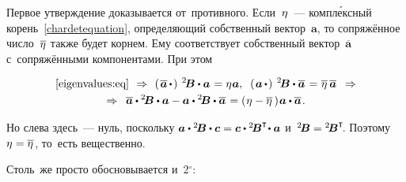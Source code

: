 \begin{otherlanguage}{russian}
Первое утверждение доказывается от~противного. Если~$\eta\hspace{.1ex}$~--- компл\'{е}ксный корень~\eqref{chardetequation}, определяющий собственный вектор~$\bm{a}$, то сопряжённое число~$\overline{\eta\hspace{.1ex}}$ также будет корнем. Ему соответствует собственный вектор~$\overline{\bm{a}}$ с~сопряжёнными компонентами. При этом

\nopagebreak\vspace{-0.4em}\begin{multline*}
\eqref{eigenvalues:eq}
\:\,\Rightarrow\:\,
\left(\hspace{.25ex} {\overline{\bm{a}} \, \dotp} \hspace{.25ex}\right) \hspace{.5ex} {^2\!\bm{B}} \dotp \bm{a} \hspace{.2ex} = \eigenvalue \bm{a}, \;\;
\left(\hspace{.2ex}{\bm{a} \, \dotp}\hspace{.2ex}\right) \hspace{.5ex} {^2\!\bm{B}} \dotp \overline{\bm{a}} \hspace{.2ex} = \hspace{.1ex} \overline{\eigenvalue} \, \overline{\bm{a}}
\:\;\Rightarrow \\[-0.1em]
%
\Rightarrow\;\: \overline{\bm{a}} \dotp {^2\!\bm{B}} \dotp \bm{a} - \bm{a} \dotp {^2\!\bm{B}} \dotp \overline{\bm{a}} \hspace{.2ex} = \left(\hspace{.1ex}{\eigenvalue - \overline{\eigenvalue}}\hspace{.16em}\right)\hspace{-0.1em} \bm{a} \dotp \overline{\bm{a}} \hspace{.2ex} .
\end{multline*}

\vspace{-0.16em} \noindent Но слева здесь~--- нуль, поскольку ${\bm{a} \dotp {^2\!\bm{B}} \dotp \bm{c} = \bm{c} \dotp {^2\!\bm{B}^{\T}\!} \dotp \bm{a}}$ и~${{^2\!\bm{B}} = {^2\!\bm{B}^{\T}\!}}$. Поэтому ${\eta\hspace{.1ex} = \overline{\eta\hspace{.1ex}}}$, то~есть вещественно.

Столь~же просто обосновывается и~2$^{\circ}$:


\end{otherlanguage}
